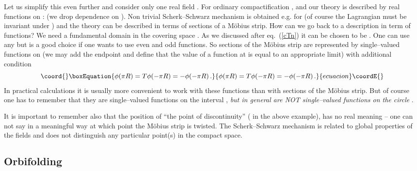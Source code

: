 \documentclass[a4paper,12pt]{article}
\def\RR{\mathbb R}
\def\id{{\,\,{\rm l}\!\!\!1}}
\begin{document}
Let us simplify this even further and consider only one real field 
\myHighlight{$\phi$}\coordHE{}. For ordinary compactification \myHighlight{$T=\id$}\coordHE{}, and our theory is
described by real functions on \coordHE{}: \coordHE{} (we drop dependence on
\coordHE{}). Non trivial Scherk--Schwarz mechanism is 
obtained e.g. for \coordHE{} (of course 
the Lagrangian must be invariant under \myHighlight{$\phi\to-\phi$}\coordHE{}) and the theory 
can be described in terms of sections of a M\"obius strip.
How can we go back to a description in term of functions?
We need a fundamental domain in the covering space \myHighlight{$\RR$}\coordHE{}.
As we discussed after eq.\ (\ref{cTn}) it can be chosen to be 
\myHighlight{$[y_0,y_0+2\pi R[\,$}\coordHE{}. One can use any \coordHE{} but \coordHE{} is a
good choice if one wants to use even and odd functions. 
So sections of the
M\"obius strip are represented by single--valued functions on
\myHighlight{$[-\pi R,\pi R]$}\coordHE{}
(we may add the endpoint \coordHE{} and define that the value of a
function at \coordHE{} is equal to an appropriate limit) 
with additional condition
\begin{equation}\coord{}\boxEquation{
\phi(\pi R)=T\phi(-\pi R) = -\phi(-\pi R)
\,.
}{
\phi(\pi R)=T\phi(-\pi R) = -\phi(-\pi R)
\,.
}{ecuacion}\coordE{}\end{equation}
In practical calculations it is usually more convenient to work with
these functions than with sections of the M\"obius strip.
But of course one has to remember that they are single--valued
functions on the interval \coordHE{}, 
{\it but in general are NOT single--valued functions on the circle
\coordHE{}}.  


It is important to remember also that the position of ``the point of
discontinuity'' (\coordHE{} in the above example), has no real
meaning -- one can not say in a 
meaningful way at which point the M\"obius strip is twisted.
The Scherk--Schwarz mechanism is related to global properties of
the fields and does not distinguish any particular point(s) in the
compact space. 




\subsection{Orbifolding}
\end{document}
